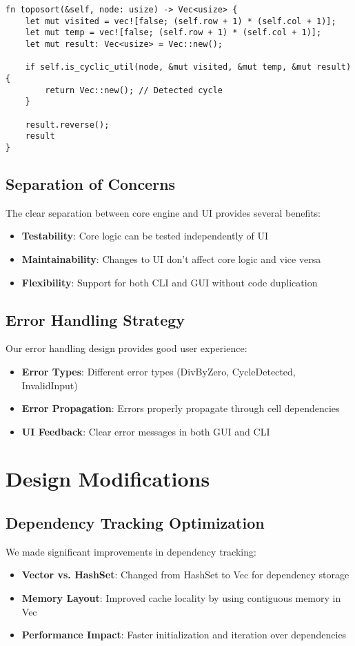 \documentclass[12pt]{article}
\begin{document}
\begin{lstlisting}[caption={Topological sorting for efficient updates}]
fn toposort(&self, node: usize) -> Vec<usize> {
    let mut visited = vec![false; (self.row + 1) * (self.col + 1)];
    let mut temp = vec![false; (self.row + 1) * (self.col + 1)];
    let mut result: Vec<usize> = Vec::new();
    
    if self.is_cyclic_util(node, &mut visited, &mut temp, &mut result) {
        return Vec::new(); // Detected cycle
    }
    
    result.reverse();
    result
}
\end{lstlisting}

\subsection{Separation of Concerns}
The clear separation between core engine and UI provides several benefits:
\begin{itemize}
    \item \textbf{Testability}: Core logic can be tested independently of UI
    \item \textbf{Maintainability}: Changes to UI don't affect core logic and vice versa
    \item \textbf{Flexibility}: Support for both CLI and GUI without code duplication
\end{itemize}

\subsection{Error Handling Strategy}
Our error handling design provides good user experience:
\begin{itemize}
    \item \textbf{Error Types}: Different error types (DivByZero, CycleDetected, InvalidInput)
    \item \textbf{Error Propagation}: Errors properly propagate through cell dependencies
    \item \textbf{UI Feedback}: Clear error messages in both GUI and CLI
\end{itemize}

\section{Design Modifications}

\subsection{Dependency Tracking Optimization}
We made significant improvements in dependency tracking:
\begin{itemize}
    \item \textbf{Vector vs. HashSet}: Changed from HashSet to Vec for dependency storage
    \item \textbf{Memory Layout}: Improved cache locality by using contiguous memory in Vec
    \item \textbf{Performance Impact}: Faster initialization and iteration over dependencies
\end{itemize}
\end{document}
